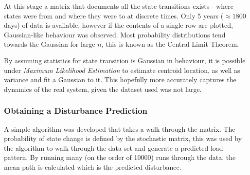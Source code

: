 At this stage a matrix that documents all the state transitions exists - where states were from and where they were to at discrete times.
Only 5 years ($\approx 1800$ days) of data is available, however if the contents of a single row are plotted, Gaussian-like behaviour was observed.
Most probability distributions tend towards the Gaussian for large $n$, this is known as the Central Limit Theorem.

By assuming statistics for state transition is Gaussian in behaviour, it is possible under \emph{Maximum Likelihood Estimation} to estimate centroid location, as well as variance and fit a Gaussian to it.
This hopefully more accurately captures the dynamics of the real system, given the dataset used was not large.

\subsubsection{Obtaining a Disturbance Prediction}

A simple algorithm was developed that takes a walk through the matrix.
The probability of state change is defined by the stochastic matrix, this was used by the algorithm to walk through the data set and generate a predicted load pattern.
By running many (on the order of 10000) runs through the data, the mean path is calculated which is the predicted disturbance.
